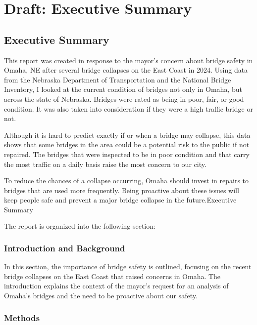 \documentclass[
  letterpaper,
  DIV=11,
  numbers=noendperiod]{scrreprt}
\begin{document}
\chapter{Draft: Executive Summary}\label{draft-executive-summary}

\section{Executive Summary}\label{executive-summary-1}

This report was created in response to the mayor's concern about bridge
safety in Omaha, NE after several bridge collapses on the East Coast in
2024. Using data from the Nebraska Department of Transportation and the
National Bridge Inventory, I looked at the current condition of bridges
not only in Omaha, but across the state of Nebraska. Bridges were rated
as being in poor, fair, or good condition. It was also taken into
consideration if they were a high traffic bridge or not.

Although it is hard to predict exactly if or when a bridge may collapse,
this data shows that some bridges in the area could be a potential risk
to the public if not repaired. The bridges that were inspected to be in
poor condition and that carry the most traffic on a daily basis raise
the most concern to our city.

To reduce the chances of a collapse occurring, Omaha should invest in
repairs to bridges that are used more frequently. Being proactive about
these issues will keep people safe and prevent a major bridge collapse
in the future.Executive Summary

The report is organized into the following section:

\subsection{Introduction and
Background}\label{introduction-and-background-1}

In this section, the importance of bridge safety is outlined, focusing
on the recent bridge collapses on the East Coast that raised concerns in
Omaha. The introduction explains the context of the mayor's request for
an analysis of Omaha's bridges and the need to be proactive about our
safety.

\subsection{Methods}\label{methods-2}
\end{document}
